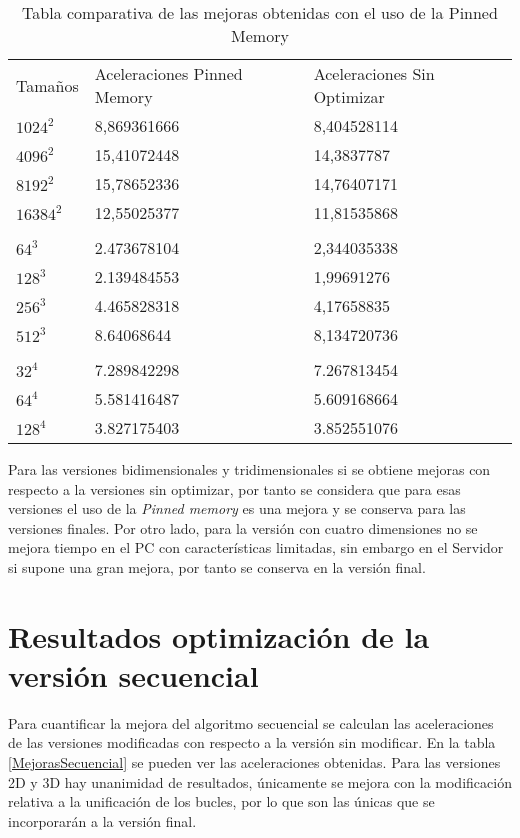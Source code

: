 \begin{table}[H]
        \centering
        \begin{tabular}{lll}
        Tamaños & Aceleraciones Pinned Memory & Aceleraciones Sin Optimizar  \\
        $1024^2$   & 8,869361666                & 8,404528114                 \\
        $4096^2$   & 15,41072448               & 14,3837787                  \\
        $8192^2$   & 15,78652336                 & 14,76407171                  \\
        $16384^2$   & 12,55025377                & 11,81535868                  \\
           &                             &                              \\
        $64^3$   & 2.473678104                 & 2,344035338                  \\
        $128^3$   & 2.139484553                 & 1,99691276                  \\
        $256^3$   & 4.465828318                 & 4,17658835                  \\
        $512^3$   & 8.64068644                  & 8,134720736                  \\
           &                             &                              \\
        $32^4$   & 7.289842298                 & 7.267813454                  \\
        $64^4$   & 5.581416487                 & 5.609168664                  \\
        $128^4$   & 3.827175403                 & 3.852551076                 
\end{tabular}
\caption{Tabla comparativa de las mejoras obtenidas con el uso de la Pinned Memory}
\label{MejorasPinnedMemory}
\end{table}

Para las versiones bidimensionales y tridimensionales si se obtiene mejoras con respecto a la versiones sin optimizar, por tanto se considera que para esas versiones el uso de la \textit{Pinned memory} es una mejora y se conserva para las versiones finales. Por otro lado, para la versión con cuatro dimensiones no se mejora tiempo en el PC con características limitadas, sin embargo en el Servidor si supone una gran mejora, por tanto se conserva en la versión final.


\section{Resultados optimización de la versión secuencial}
Para cuantificar la mejora del algoritmo secuencial se calculan las aceleraciones de las versiones modificadas con respecto a la versión sin modificar. En la tabla \ref{MejorasSecuencial} se pueden ver las aceleraciones obtenidas. Para las versiones 2D y 3D hay unanimidad de resultados, únicamente se mejora con la modificación relativa a la unificación de los bucles, por lo que son las únicas que se incorporarán a la versión final.

